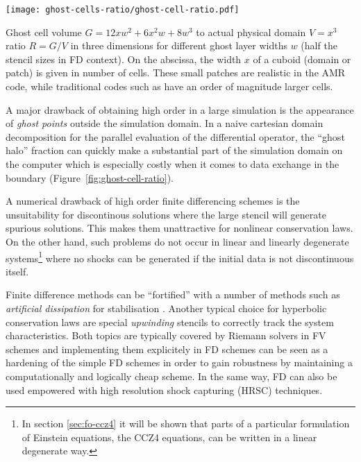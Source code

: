 \begin{marginfigure}[-2cm]
\texttt{[image: ghost-cells-ratio/ghost-cell-ratio.pdf]}
\caption[
  Sketch of the ghost cell ratio to payload ratio, \exclusive
]{
  Ghost cell volume $G=12xw^2 + 6x^2 w + 8w^3$ to actual physical
  domain $V=x^3$ ratio $R=G/V$ in three dimensions for
  different ghost layer widths $w$ (\ie half the stencil sizes in FD context).
  On the abscissa, the width $x$ of a cuboid (domain or patch) is given in
  number of cells. These small patches are realistic in the
   AMR code, while traditional codes such as 
  have an order of magnitude larger cells.
}
\label{fig:ghost-cell-ratio}
\end{marginfigure}

A major drawback of obtaining high order in a large simulation is the
appearance of \emph{ghost points} outside the simulation domain. In a naive
cartesian domain decomposition for the parallel evaluation of the
differential operator, the ``ghost halo'' fraction can quickly make a
substantial part of the simulation domain on the computer which is especially
costly when it comes to data exchange in the boundary
(Figure~\ref{fig:ghost-cell-ratio}).%

A numerical drawback of high order finite differencing schemes is the 
unsuitability for discontinous solutions where the large stencil will generate
spurious solutions. This makes them unattractive for nonlinear conservation
laws. On the other hand, such problems do not occur in linear and linearly
degenerate systems\footnote{In section \vref{sec:fo-ccz4} it will be shown
that parts of a  particular formulation of Einstein equations, the CCZ4
equations, can be written in a linear degenerate way.} where no shocks can be 
generated if the initial data is not discontinuous itself.

Finite difference methods can be ``fortified'' with a number of methods such
as \emph{artificial dissipation} for stabilisation \cite{Kreiss73}.
Another typical choice
for hyperbolic conservation laws are special \emph{upwinding} stencils to
correctly track the system characteristics. Both topics are typically
covered by Riemann solvers in FV schemes and implementing them explicitely
in FD schemes can be seen as a hardening of the simple FD schemes in order
to gain robustness by maintaining a computationally and logically cheap scheme.
In the same way, FD can also be used empowered
with high resolution shock capturing (HRSC) techniques.

